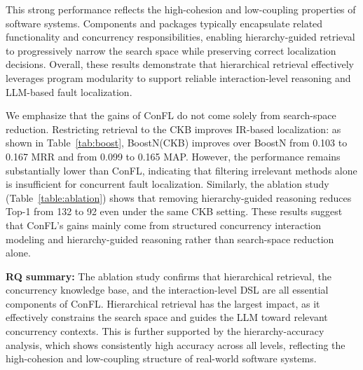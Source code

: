 This strong performance reflects the high-cohesion and low-coupling properties of software systems.
Components and packages typically encapsulate related functionality and concurrency responsibilities, enabling hierarchy-guided retrieval to progressively narrow the search space while preserving correct localization decisions.
Overall, these results demonstrate that hierarchical retrieval effectively leverages program modularity to support reliable interaction-level reasoning and LLM-based fault localization.


We emphasize that the gains of ConFL do not come solely from search-space reduction. Restricting retrieval to the CKB improves IR-based localization: as shown in Table~\ref{tab:boost}, BoostN(CKB) improves over BoostN from 0.103 to 0.167 MRR and from 0.099 to 0.165 MAP. However, the performance remains substantially lower than ConFL, indicating that filtering irrelevant methods alone is insufficient for concurrent fault localization. Similarly, the ablation study (Table~\ref{table:ablation}) shows that removing hierarchy-guided reasoning reduces Top-1 from 132 to 92 even under the same CKB setting. These results suggest that ConFL's gains mainly come from structured concurrency interaction modeling and hierarchy-guided reasoning rather than search-space reduction alone.



\vspace{-0.5em}
\vspace*{3pt}
\begin{tcolorbox}
{\bf RQ\thefindingsCounter{} summary:} {
The ablation study confirms that hierarchical retrieval, the concurrency knowledge base, and the interaction-level DSL are all essential components of ConFL.
Hierarchical retrieval has the largest impact, as it effectively constrains the search space and guides the LLM toward relevant concurrency contexts.
This is further supported by the hierarchy-accuracy analysis, which shows consistently high accuracy across all levels, reflecting the high-cohesion and low-coupling structure of real-world software systems.
}
\end{tcolorbox}